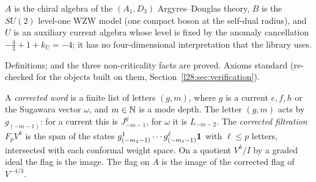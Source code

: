 \begin{physics}
$A$ is the chiral algebra of the $(A_1,D_3)$ Argyres--Douglas theory, $B$ is the $SU(2)$ level-one WZW model (one compact
boson at the self-dual radius), and $U$ is an auxiliary current algebra whose level is fixed by the anomaly cancellation
$-\tfrac43+1+k_U=-4$; it has no four-dimensional interpretation that the library uses.
\end{physics}

\begin{status}
Definitions;  and the three non-criticality facts are proved. Axioms standard (re-checked for the
objects built on them, Section~\ref{l28:sec:verification}).
\end{status}

\begin{definition}\label{l28:def:corrected}
A \emph{corrected word} is a finite list of letters $(g,m)$, where $g$ is a current $e,f,h$ or the Sugawara vector $\omega$,
and $m\in{\mathbb{N}}$ is a mode depth. The letter $(g,m)$ acts by $g_{(-m-1)}$: for a current this is $J^g_{-m-1}$, for $\omega$ it is
$L_{-m-2}$. The \emph{corrected filtration} $F_pV^k$ is the span of the states $g^1_{(-m_1-1)}\cdots g^\ell_{(-m_\ell-1)}\mathbf 1$
with $\ell\le p$ letters, intersected with each conformal weight space. On a quotient $V^k/I$ by a graded ideal the flag is the
image. The flag on $A$ is the image of the corrected flag of $V^{-4/3}$.
\end{definition}

